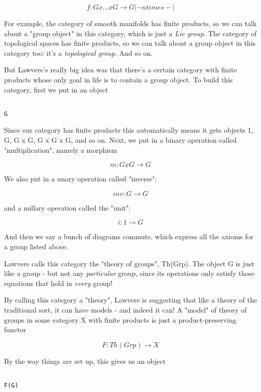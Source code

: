 $$

f: G x  ...  x G \to  G
   |- n times -|
$$
    

For example, the category of smooth manifolds has finite products, so
we can talk about a "group object" in this category, which
is just a \emph{Lie group}.  The category of topological spaces has
finite products, so we can talk about a group object in this category
too: it's a \emph{topological group}.  And so on.

But Lawvere's really big idea was that there's a certain category
with finite products whose only goal in life is to contain a group
object.  To build this category, first we put in an object 


\begin{verbatim}

G
\end{verbatim}
    
Since our category has finite products this automatically means
it gets objects 1, G, G x G, G x G x G, and so on.  Next, we put in 
a binary operation called "multiplication", namely a morphism


$$

m: G x G \to  G
$$
    
We also put in a unary operation called "inverse":


$$

inv: G \to  G
$$
    
and a nullary operation called the "unit":


$$

i: 1 \to  G
$$
    
And then we say a bunch of diagrams commute, which express all
the axioms for a group listed above.

Lawvere calls this category the "theory of groups", Th(Grp).
The object G is just like a group - but not any \emph{particular} group,
since its operations only satisfy those equations that hold in \emph{every}
group!

By calling this category a "theory", Lawvere is suggesting
that like a theory of the traditional sort, it can have models - and
indeed it can!  A "model" of theory of groups in some
category X with finite products is just a product-preserving functor


$$

F: Th(Grp) \to  X
$$
    
By the way things are set up, this gives us an object


\begin{verbatim}

F(G)
\end{verbatim}
    
